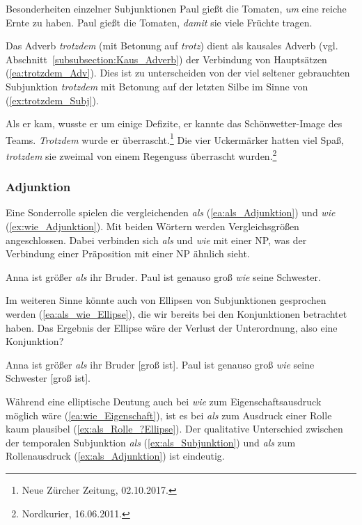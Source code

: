 \begin{Exkurs}{Besonderheiten einzelner Subjunktionen}
\ea \label{ea:um_zu_damit}
\ea \label{ea:um_zu} Paul gießt die Tomaten, \textit{um} eine reiche Ernte zu haben.
\ex \label{ex:damit} Paul gießt die Tomaten, \textit{damit} sie viele Früchte tragen.
\z 
\z 


Das Adverb \textit{trotzdem} (mit Betonung auf \textit{trotz}) dient als kausales Adverb (vgl. Abschnitt~\ref{subsubsection:Kaus_Adverb}) der Verbindung von Hauptsätzen (\ref{ea:trotzdem_Adv}). Dies ist zu unterscheiden von der viel seltener gebrauchten Subjunktion \textit{trotzdem} mit Betonung auf der letzten Silbe im Sinne von  (\ref{ex:trotzdem_Subj}).

\ea \label{ea:trotzdem_Adv_Subj}
\ea \label{ea:trotzdem_Adv} Als er kam, wusste er um einige Defizite, er kannte das Schönwetter-Image des Teams. \textit{Trotzdem} wurde er überrascht.\footnote{Neue Zürcher Zeitung, 02.10.2017.}
\ex \label{ex:trotzdem_Subj} Die vier Uckermärker hatten viel Spaß, \textit{trotzdem} sie zweimal von einem Regenguss überrascht wurden.\footnote{Nordkurier, 16.06.2011.}
\z 
\z 
\end{Exkurs}


\subsubsection{Adjunktion}\label{subsubsection:Adjunktion}

Eine Sonderrolle spielen die vergleichenden \textit{als} (\ref{ea:als_Adjunktion}) und \textit{wie} (\ref{ex:wie_Adjunktion}). Mit beiden Wörtern werden Vergleichsgrößen angeschlossen. Dabei verbinden sich \textit{als} und \textit{wie} \zB mit einer NP, was der Verbindung einer Präposition mit einer NP ähnlich sieht.

\ea \label{ea:als_wie_Adjunktion}
\ea \label{ea:als_Adjunktion} Anna ist größer \textit{als} ihr Bruder.
\ex \label{ex:wie_Adjunktion} Paul ist genauso groß \textit{wie} seine Schwester.
\z 
\z 

Im weiteren Sinne könnte auch von Ellipsen von Subjunktionen gesprochen werden (\ref{ea:als_wie_Ellipse}), die wir bereits bei den Konjunktionen betrachtet haben. Das Ergebnis der Ellipse wäre der Verlust der Unterordnung, also eine Konjunktion?

\ea \label{ea:als_wie_Ellipse}
\ea \label{ea:als_Ellipse} Anna ist größer \textit{als} ihr Bruder [groß ist].
\ex \label{ex:wie_Ellipse} Paul ist genauso groß \textit{wie} seine Schwester [groß ist].
\z 
\z 

Während eine elliptische Deutung auch bei \textit{wie} zum Eigenschaftsausdruck möglich wäre (\ref{ea:wie_Eigenschaft}), ist es bei \textit{als} zum Ausdruck einer Rolle kaum plausibel (\ref{ex:als_Rolle_?Ellipse}). Der qualitative Unterschied zwischen der temporalen Subjunktion \textit{als} (\ref{ex:als_Subjunktion}) und \textit{als} zum Rollenausdruck (\ref{ex:als_Adjunktion}) ist eindeutig.

